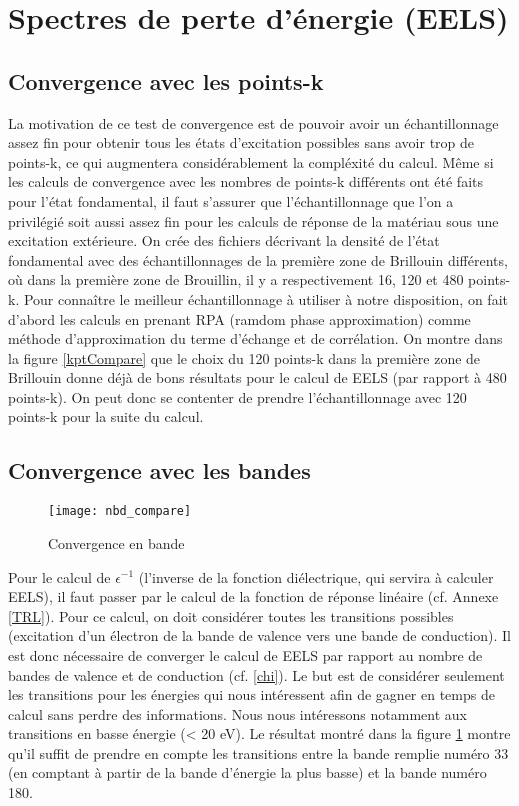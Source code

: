 \section{Spectres de perte d'énergie (EELS)}
\subsection{Convergence avec les points-k}
La motivation de ce test de convergence est de pouvoir avoir un échantillonnage assez fin pour obtenir tous les états d'excitation possibles sans avoir trop de points-k, ce qui augmentera considérablement la compléxité du calcul.
Même si les calculs de convergence avec les nombres de points-k différents ont été faits pour l'état fondamental, il faut s'assurer que l'échantillonnage que l'on a privilégié soit aussi assez fin pour les calculs de réponse de la matériau sous une excitation extérieure. 
On crée des fichiers décrivant la densité de l'état fondamental avec des échantillonnages de la première zone de Brillouin différents, où dans la première zone de Brouillin, il y a respectivement 16, 120 et 480 points-k. 
Pour connaître le meilleur échantillonnage à utiliser à notre disposition, on fait d'abord les calculs en prenant RPA (ramdom phase approximation) comme méthode d'approximation du terme d'échange et de corrélation.
On montre dans la figure \ref{kptCompare} que le choix du 120 points-k dans la première zone de Brillouin donne déjà de bons résultats pour le calcul de EELS (par rapport à 480 points-k). On peut donc se contenter de prendre l'échantillonnage avec 120 points-k pour la suite du calcul.

\subsection{Convergence avec les bandes}

\begin{figure}[!h]\label{cv_nbd}
    \centering
    \texttt{[image: nbd\_compare]}
    \caption{Convergence en bande}
\end{figure}

Pour le calcul de $\epsilon^{-1}$ (l'inverse de la fonction diélectrique, qui servira à calculer EELS), il faut passer par le calcul de la fonction de réponse linéaire (cf. Annexe \ref{TRL}). 
Pour ce calcul, on doit considérer toutes les transitions possibles (excitation d'un électron de la bande de valence vers une bande de conduction). 
Il est donc nécessaire de converger le calcul de EELS par rapport au nombre de bandes de valence et de conduction (cf. \ref{chi}). 
Le but est de considérer seulement les transitions pour les énergies qui nous intéressent afin de gagner en temps de calcul sans perdre des informations. 
Nous nous intéressons notamment aux transitions en basse énergie (< 20 eV).
Le résultat montré dans la figure \ref{cv_nbd} montre qu'il suffit de prendre en compte les transitions entre la bande remplie numéro 33 (en comptant à partir de la bande d'énergie la plus basse) et la bande numéro 180. 

